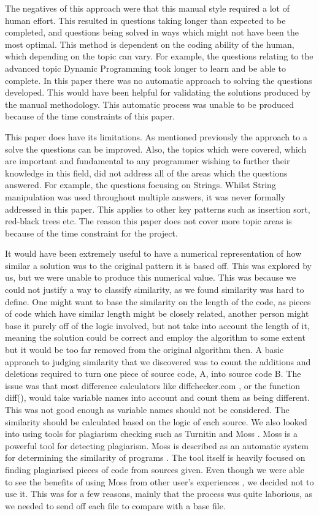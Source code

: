 \documentclass[10pt,twocolumn]{IEEEtran}
\begin{document}
The negatives of this approach were that this manual style required a lot of human effort. This resulted in questions taking longer than expected to be completed, and questions being solved in ways which might not have been the most optimal. This method is dependent on the coding ability of the human, which depending on the topic can vary. For example, the questions relating to the advanced topic Dynamic Programming took longer to learn and be able to complete.
 In this paper there was no automatic approach to solving the questions developed. This would have been helpful for validating the solutions produced by the manual methodology. This automatic process was unable to be produced because of the time constraints of this paper. 
 \par This paper does have its limitations. As mentioned previously the approach to a solve the questions can be improved. Also, the topics which were covered, which are important and fundamental to any programmer wishing to further their knowledge in this field, did not address all of the areas which the questions answered. For example, the questions focusing on Strings. Whilst String manipulation was used throughout multiple answers, it was never formally addressed in this paper. This applies to other key patterns such as insertion sort, red-black trees etc. The reason this paper does not cover more topic areas is because of the time constraint for the project.
\par It would have been extremely useful to have a numerical representation of how similar a solution was to the original pattern it is based off. This was explored by us, but we were unable to produce this numerical value. This was because we could not justify a way to classify similarity, as we found similarity was hard to define. One might want to base the similarity on the length of the code, as pieces of code which have similar length might be closely related, another person might base it purely off of the logic involved, but not take into account the length of it, meaning the solution could be correct and employ the algorithm to some extent but it would be too far removed from the original algorithm then. A basic approach to judging similarity that we discovered was to count the additions and deletions required to turn one piece of source code, A, into source code B. The issue was that most difference calculators like diffchecker.com \cite{diff}, or the function diff(), would take variable names into account and count them as being different. This was not good enough as variable names should not be considered. The similarity should be calculated based on the logic of each source. We also looked into using tools for plagiarism checking such as Turnitin and Moss \cite{Schleimer:2003:WLA:872757.872770}. Moss is a powerful tool for detecting plagiarism. Moss is described as an automatic system for determining the similarity of programs \cite{mosswebsite}. The tool itself is heavily focused on finding plagiarised pieces of code from sources given. Even though we were able to see the benefits of using Moss from other user's experiences \cite{MossBowyer}, we decided not to use it. This was for a few reasons, mainly that the process was quite laborious, as we needed to send off each file to compare with a base file. 


\end{document}
